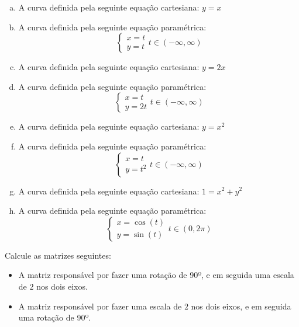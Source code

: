 \documentclass[12pt]{exam}
\begin{document}
\begin{questions}
\begin{enumerate}[a)]

\item A curva definida pela seguinte equação cartesiana: $y = x$

\item A curva definida pela seguinte equação paramétrica: 
\[\begin{cases}
    x=t\\
    y=t
\end{cases}
t\in (-\infty,\infty)\]

\item A curva definida pela seguinte equação cartesiana: $y = 2x$

\item A curva definida pela seguinte equação paramétrica: 
\[\begin{cases}
    x=t\\
    y=2t
\end{cases}
t\in (-\infty,\infty)\]

\item A curva definida pela seguinte equação cartesiana: $y = x^2$

\item A curva definida pela seguinte equação paramétrica: 
\[\begin{cases}
    x=t\\
    y=t^2
\end{cases}
t\in (-\infty,\infty)\]

\item A curva definida pela seguinte equação cartesiana: $1 = x^2 + y^2$

\item A curva definida pela seguinte equação paramétrica: 
\[\begin{cases}
    x=\cos (t)\\
    y=\sin (t)
\end{cases}
t\in (0, 2\pi)\]


\end{enumerate}



\break

\question Calcule as matrizes seguintes:

\begin{itemize}

\item A matriz responsável por fazer uma rotação de 90º, e em seguida uma escala de $2$ nos dois eixos.

\item A matriz responsável por fazer uma escala de $2$ nos dois eixos, e em seguida uma rotação de 90º.


\end{itemize}
\end{questions}
\end{document}
